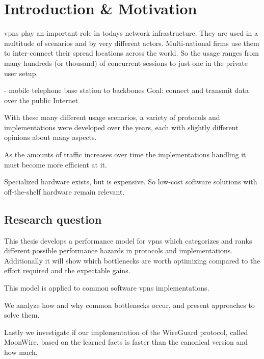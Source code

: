 \chapter{Introduction \& Motivation}
\label{chap:intro}

\Acp{vpn} play an important role in todays network infrastructure. %
They are used in a multitude of scenarios and by very different actors. Multi-national firms use them to inter-connect their spread locations across the world. 
So the usage ranges from many hundreds (or thousand) of concurrent sessions to just one in the private user setup.

- mobile telephone base station to backbones 
Goal: connect and transmit data over the public Internet

With these many different usage scenarios, a variety of protocols and implementations were developed over the years, each with slightly different opinions about many aspects.

As the amounts of traffic increases over time \cite{DECIX} the implementations handling it must become more efficient at it.

Specialized hardware exists, but is expensive. So low-cost software solutions with off-the-shelf hardware remain relevant.

\section{Research question}
This thesis develops a performance model for \Acp{vpn} which categorizes and ranks different possible performance hazards in protocols and implementations. Additionally it will show which bottlenecks are worth optimizing compared to the effort required and the expectable gains.

This model is applied to common software \Acp{vpn} implementations.

We analyze how and why common bottlenecks occur, and present approaches to solve them.

Lastly we investigate if our implementation of the WireGuard protocol, called MoonWire, based on the learned facts is faster than the canonical version and how much.

